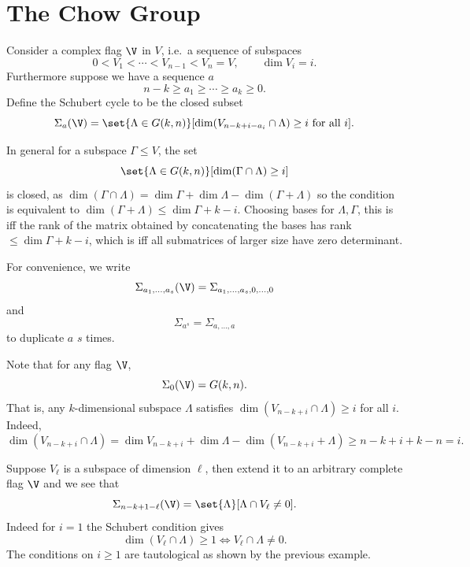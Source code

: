 \section{The Chow Group}

\bdefn

    Consider a complex flag $\V$ in $V$, i.e.\ a sequence of subspaces
    $$ 0 < V_1 < \cdots < V_{n-1} < V_n = V,\qquad \dim V_i = i . $$
    Furthermore suppose we have a sequence $a$
    $$ n-k \geq a_1 \geq \cdots \geq a_k \geq 0 . $$
    Define the {\emphcolor Schubert cycle} to be the closed subset
    $$ \Sigma_a(\V) = \set{\Lambda\in G(k,n)}[\dim(V_{n-k+i-a_i}\cap\Lambda)\geq i\hbox{ for all $i$}] . $$

\edefn

\bremark

    In general for a subspace $\Gamma\leq V$, the set
    $$ \set{\Lambda\in G(k,n)}[\dim(\Gamma\cap\Lambda)\geq i] $$
    is closed, as $\dim(\Gamma\cap\Lambda)=\dim\Gamma+\dim\Lambda-\dim(\Gamma+\Lambda)$ so the condition
    is equivalent to $\dim(\Gamma+\Lambda)\leq\dim\Gamma+k-i$.
    Choosing bases for $\Lambda,\Gamma$, this is iff the rank of the matrix obtained by concatenating the
    bases has rank $\leq\dim\Gamma+k-i$, which is iff all submatrices of larger size have zero determinant.

\eremark

For convenience, we write
$$ \Sigma_{a_1,\dots,a_s}(\V) = \Sigma_{a_1,\dots,a_s,0,\dots,0} $$
and
$$ \Sigma_{a^s} = \Sigma_{a,\dots,a} $$
to duplicate $a$ $s$ times.

\bexam

    Note that for any flag $\V$,
    $$ \Sigma_0(\V) = G(k,n) . $$
    That is, any $k$-dimensional subspace $\Lambda$ satisfies $\dim(V_{n-k+i}\cap\Lambda)\geq i$ for all $i$.
    Indeed,
    $$ \dim(V_{n-k+i}\cap\Lambda) = \dim V_{n-k+i} + \dim\Lambda - \dim(V_{n-k+i}+\Lambda) \geq
    n - k + i + k - n = i . $$

\eexam

\bexam

    Suppose $V_\ell$ is a subspace of dimension $\ell$, then extend it to an arbitrary complete flag $\V$
    and we see that
    $$ \Sigma_{n-k+1-\ell}(\V) = \set{\Lambda}[\Lambda\cap V_\ell\neq0] . $$
    Indeed for $i=1$ the Schubert condition gives
    $$ \dim(V_\ell\cap\Lambda) \geq 1 \iff V_\ell\cap\Lambda\neq 0 . $$
    The conditions on $i\geq1$ are tautological as shown by the previous example.

\eexam

